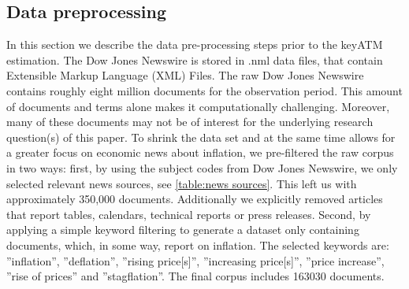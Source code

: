 






\newpage







\subsection{Data preprocessing}\label{subsec:DataPrep}

In this section we describe the data pre-processing steps prior to the keyATM estimation.
The Dow Jones Newswire is stored in .nml data files, that contain Extensible Markup Language (XML) Files. The raw Dow Jones Newswire contains roughly eight million documents for the observation period. This amount of documents and terms alone makes it computationally challenging. Moreover, many of these documents may not be of interest for the underlying research question(s) of this paper. To shrink the data set and at the same time allows for a greater focus on economic news about inflation, we pre-filtered the raw corpus in two ways: first, by using the subject codes from Dow Jones Newswire, we only selected relevant news sources, see \ref{table:news sources}. This left us with approximately 350,000 documents. Additionally we explicitly removed articles that report tables, calendars, technical reports or press releases. Second, by applying a simple keyword filtering to generate a dataset only containing documents, which, in some way, report on inflation. The selected keywords are:  ''inflation'', ''deflation'', ''rising price[s]'', ''increasing price[s]'', ''price increase'', ''rise of prices'' and ''stagflation''. The final corpus includes 163030 documents. 


